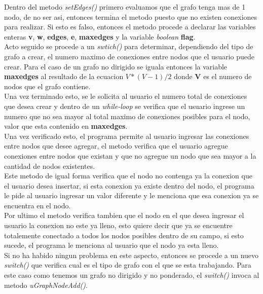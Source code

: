 \documentclass{article}
\begin{document}
				Dentro del metodo \emph{setEdges()} primero evaluamos que el grafo tenga mas de 1 nodo, de no ser asi, entonces termina el metodo puesto que no existen conexiones para realizar. Si esto es falso, entonces el metodo procede a declarar las variables enteras \textbf{v}, \textbf{w}, \textbf{edges}, \textbf{e}, \textbf{maxedges} y la variable \textit{boolean} \textbf{flag}.\\
				
				Acto seguido se procede a un \textit{swtich()} para determinar, dependiendo del tipo de grafo a crear, el numero maximo de conexiones entre nodos que el usuario puede crear. Para el caso de un grafo no dirigido se iguala entonces la variable \textbf{maxedges} al resultado de la ecuacion $V*(V-1)/2$ donde \textbf{V} es el numero de nodos que el grafo contiene.\\
				
				Una vez terminado esto, se le solicita al usuario el numero total de conexiones que desea crear y dentro de un \textit{while-loop} se verifica que el usuario ingrese un numero que no sea mayor al total maximo de conexiones posibles para el nodo, valor que esta contenido en \textbf{maxedges}.\\
				
				Una vez verificado esto, el programa permite al usuario ingresar las conexiones entre nodos que desee agregar, el metodo verifica que el usuario agregue conexiones entre nodos que existan y que no agregue un nodo que sea mayor a la cantidad de nodos existentes.\\
				
				Este metodo de igual forma verifica que el nodo no contenga ya la conexion que el usuario desea insertar, si esta conexion ya existe dentro del nodo, el programa le pide al usuario ingresar un valor diferente y le menciona que esa conexion ya se encuentra en el nodo.\\
				
				Por ultimo el metodo verifica tambien que el nodo en el que desea ingresar el usuario la conexion no este ya lleno, esto quiere decir que ya se encuentre totalemente conectado a todos los nodos posibles dentro de su campo, si esto sucede, el programa le menciona al usuario que el nodo ya esta lleno.\\
				
				Si no ha habido ningun problema en este aspecto, entonces se procede a un nuevo \textit{switch()} que verifica cual es el tipo de grafo con el que se esta trabajando. Para este caso como tenemos un grafo no dirigido y no ponderado, el \textit{switch()} invoca al metodo \emph{uGraphNodeAdd()}.\\
				
\end{document}
